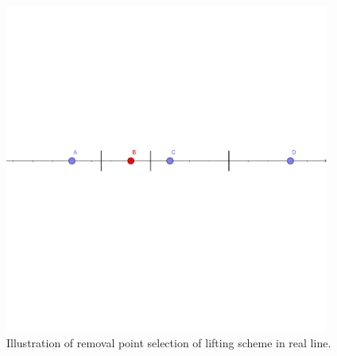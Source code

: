 \documentclass[11pt,titlepage]{article}
\begin{document}
\begin{figure}
		\vspace{-5mm}
		\includegraphics[width=0.95\textwidth]{Stream_result/horzline.pdf}
		\caption{Illustration of removal point selection of lifting scheme in real line.}
		\vspace{-3mm}
		\label{fig:removeI}
	\end{figure}


%


\end{document}

